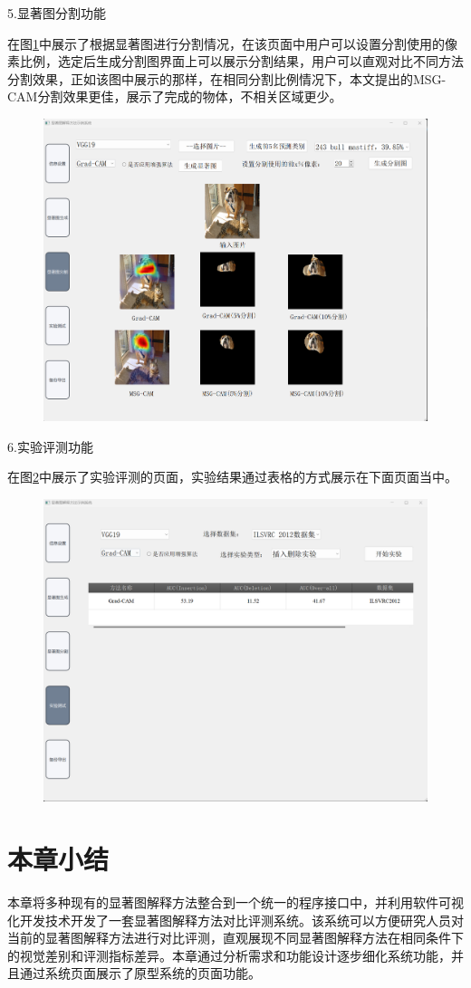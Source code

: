 5.显著图分割功能

在图\ref{fig:f5}中展示了根据显著图进行分割情况，在该页面中用户可以设置分割使用的像素比例，选定后生成分割图界面上可以展示分割结果，用户可以直观对比不同方法分割效果，正如该图中展示的那样，在相同分割比例情况下，本文提出的MSG-CAM分割效果更佳，展示了完成的物体，不相关区域更少。

\begin{figure}[h]
	\centering 
	\includegraphics[width=15cm]{fig/ch5/f5.png}
	\label{fig:f5}
\end{figure}

6.实验评测功能

在图\ref{fig:f6}中展示了实验评测的页面，实验结果通过表格的方式展示在下面页面当中。

\begin{figure}[h]
	\centering 
	\includegraphics[width=15cm]{fig/ch5/f6.png}
	\label{fig:f6}
\end{figure}

\section{本章小结}
本章将多种现有的显著图解释方法整合到一个统一的程序接口中，并利用软件可视化开发技术开发了一套显著图解释方法对比评测系统。该系统可以方便研究人员对当前的显著图解释方法进行对比评测，直观展现不同显著图解释方法在相同条件下的视觉差别和评测指标差异。本章通过分析需求和功能设计逐步细化系统功能，并且通过系统页面展示了原型系统的页面功能。